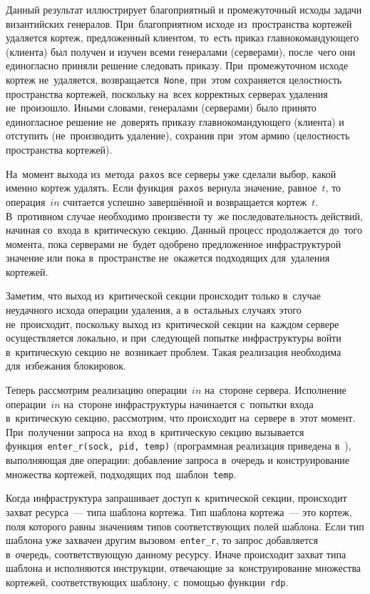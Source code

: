Данный результат иллюстрирует благоприятный и промежуточный исходы задачи византийских генералов. При~благоприятном исходе из~пространства кортежей удаляется кортеж, предложенный клиентом, то~есть приказ главнокомандующего (клиента) был получен и изучен всеми генералами (серверами), после~чего они единогласно приняли решение следовать приказу. При~промежуточном исходе кортеж не~удаляется, возвращается~\texttt{None}, при~этом сохраняется целостность пространства кортежей, поскольку на~всех корректных серверах удаления не~произошло. Иными словами, генералами (серверами) было принято единогласное решение не~доверять приказу главнокомандующего (клиента) и отступить (не~производить удаление), сохранив при~этом армию (целостность пространства кортежей).

На~момент выхода из~метода~\texttt{paxos} все серверы уже сделали выбор, какой именно кортеж удалять. Если функция~\texttt{paxos} вернула значение, равное~$t$, то операция~$in$ считается успешно завершённой и возвращается кортеж~$t$. В~противном случае необходимо произвести ту~же последовательность действий, начиная со~входа в~критическую секцию. Данный процесс продолжается до~того момента, пока серверами не~будет одобрено предложенное инфраструктурой значение или пока в~пространстве не~окажется подходящих для~удаления кортежей.

Заметим, что выход из~критической секции происходит только в~случае неудачного исхода операции удаления, а в~остальных случаях этого не~происходит, поскольку выход из~критической секции на~каждом сервере осуществляется локально, и при~следующей попытке инфраструктуры войти в~критическую секцию не~возникает проблем. Такая реализация необходима для~избежания блокировок.

Теперь рассмотрим реализацию операции~$in$ на~стороне сервера. Исполнение операции~$in$ на~стороне инфраструктуры начинается с~попытки входа в~критическую секцию, рассмотрим, что происходит на~сервере в~этот момент. При~получении запроса на~вход в~критическую секцию вызывается функция~\texttt{enter_r(sock, pid, temp)} (программная реализация приведена в~\autocite{mybts}), выполняющая две операции: добавление запроса в~очередь и конструирование множества кортежей, подходящих под~шаблон~\texttt{temp}.

Когда инфраструктура запрашивает доступ к~критической секции, происходит захват ресурса~--- типа шаблона кортежа. Тип шаблона кортежа~--- это кортеж, поля которого равны значениям типов соответствующих полей шаблона. Если тип шаблона уже захвачен другим вызовом~\texttt{enter_r}, то запрос добавляется в~очередь, соответствующую данному ресурсу. Иначе происходит захват типа шаблона и исполняются инструкции, отвечающие за~конструирование множества кортежей, соответствующих шаблону, с~помощью функции~\texttt{rdp}.

